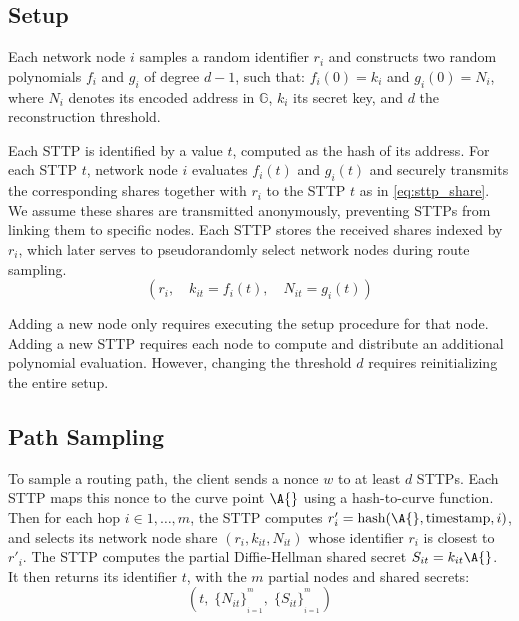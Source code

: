 \subsection{Setup}

Each network node $i$ samples a random identifier $r_i$ and constructs two random polynomials $f_i$ and $g_i$ of degree $d-1$, such that:
$f_i(0) = k_i$ and $g_i(0) = N_i$, where $N_i$ denotes its encoded address in $\mathbb{G}$, $k_i$ its secret key, and $d$ the reconstruction threshold.

Each STTP is identified by a value $t$, computed as the hash of its address. 
For each STTP $t$, network node $i$ evaluates $f_i(t)$ and $g_i(t)$ and securely transmits the corresponding shares together with $r_i$ to the STTP $t$ as in \eqref{eq:sttp_share}.
We assume these shares are transmitted anonymously, preventing STTPs from linking them to specific nodes. 
Each STTP stores the received shares indexed by $r_i$, which later serves to pseudorandomly select network nodes during route sampling.
\begin{equation}
    (r_i,\quad k_{it}=f_i(t),\quad N_{it}=g_i(t))
    \label{eq:sttp_share}
\end{equation}

Adding a new node only requires executing the setup procedure for that node. 
Adding a new STTP requires each node to compute and distribute an additional polynomial evaluation. 
However, changing the threshold $d$ requires reinitializing the entire setup.

\subsection{Path Sampling}\label{sec:path_sampling}

To sample a routing path, the client sends a nonce $w$ to at least $d$ STTPs. 
Each STTP maps this nonce to the curve point $\A{}$ using a hash-to-curve function.
Then for each hop $i\in{1,\ldots,m}$, the STTP computes $r'_i = \text{hash}\!\left(\A{}, \text{timestamp}, i\right)$, and selects its network node share $(r_i, k_{it}, N_{it})$ whose identifier $r_i$ is closest to $r'_i$.
The STTP computes the partial Diffie-Hellman shared secret $S_{it} = k_{it}\A{}$.
It then returns its identifier $t$, with the $m$ partial nodes and shared secrets:
\begin{equation*}
    \left(t,\; \{N_{it}\}_{_{i=1}}^{^{m}},\; \{S_{it}\}_{_{i=1}}^{^{m}}\right)
\end{equation*}

